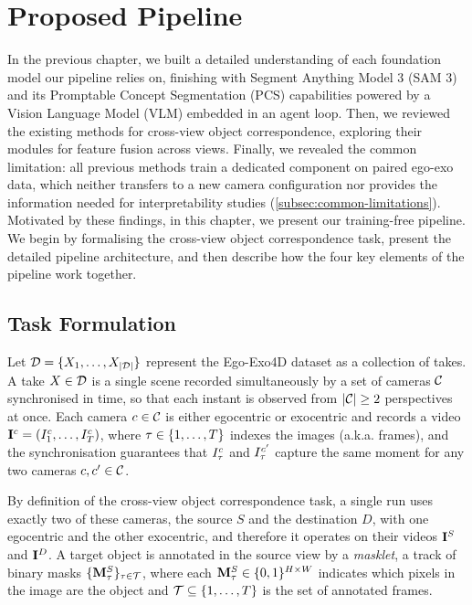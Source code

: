 \chapter{Proposed Pipeline}
\label{chap:pipeline}

In the previous chapter, we built a detailed understanding of each foundation model our pipeline relies on, finishing with Segment Anything Model 3 (SAM 3) and its Promptable Concept Segmentation (PCS) capabilities powered by a Vision Language Model (VLM) embedded in an agent loop. Then, we reviewed the existing methods for cross-view object correspondence, exploring their modules for feature fusion across views. Finally, we revealed the common limitation: all previous methods train a dedicated component on paired ego-exo data, which neither transfers to a new camera configuration nor provides the information needed for interpretability studies (\cref{subsec:common-limitations}). Motivated by these findings, in this chapter, we present our training-free pipeline. We begin by formalising the cross-view object correspondence task, present the detailed pipeline architecture, and then describe how the four key elements of the pipeline work together.  

\section{Task Formulation}
\label{sec:task-formulation}

Let $\mathcal{D} = \{X_1, \ldots, X_{|\mathcal{D}|}\}$ represent the Ego-Exo4D dataset as a collection of takes. A take $X \in \mathcal{D}$ is a single scene recorded simultaneously by a set of cameras $\mathcal{C}$ synchronised in time, so that each instant is observed from $|\mathcal{C}| \geq 2$ perspectives at once. Each camera $c \in \mathcal{C}$ is either egocentric or exocentric and records a video $\mathbf{I}^c = (I^c_1, \ldots, I^c_T)$, where $\tau \in \{1, \ldots, T\}$ indexes the images (a.k.a. frames), and the synchronisation guarantees that $I^c_\tau$ and $I^{c'}_\tau$ capture the same moment for any two cameras $c, c' \in \mathcal{C}$. 

By definition of the cross-view object correspondence task, a single run uses exactly two of these cameras, the source $S$ and the destination $D$, with one egocentric and the other exocentric, and therefore it operates on their videos $\mathbf{I}^S$ and $\mathbf{I}^D$. A target object is annotated in the source view by a \textit{masklet}, a track of binary masks $\{\mathbf{M}^S_\tau\}_{\tau \in \mathcal{T}}$, where each $\mathbf{M}^S_\tau \in \{0,1\}^{H \times W}$ indicates which pixels in the image are the object and $\mathcal{T} \subseteq \{1, \ldots, T\}$ is the set of annotated frames. 

